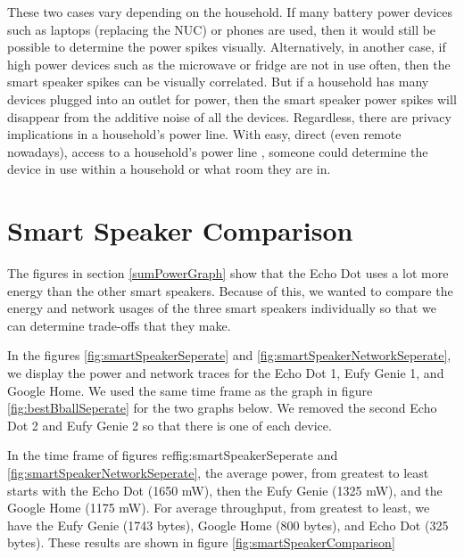 These two cases vary depending on the household. If many battery power devices such as laptops (replacing the NUC) or phones are used, then it would still be possible to determine the power spikes visually. Alternatively, in another case, if high power devices such as the microwave or fridge are not in use often, then the smart speaker spikes can be visually correlated. But if a household has many devices plugged into an outlet for power, then the smart speaker power spikes will disappear from the additive noise of all the devices. Regardless, there are privacy implications in a household's power line. With easy, direct (even remote nowadays), access to a household's power line \cite{griffith_2017}, someone could determine the device in use within a household or what room they are in.

\section{Smart Speaker Comparison}
\label{smartSpeakerComparisonSection}
The figures in section \ref{sumPowerGraph} show that the Echo Dot uses a lot more energy than the other smart speakers. Because of this, we wanted to compare the energy and network usages of the three smart speakers individually so that we can determine trade-offs that they make.

In the figures \ref{fig:smartSpeakerSeperate} and \ref{fig:smartSpeakerNetworkSeperate}, we display the power and network traces for the Echo Dot 1, Eufy Genie 1, and Google Home. We used the same time frame as the graph in figure \ref{fig:bestBballSeperate} for the two graphs below. We removed the second Echo Dot 2 and Eufy Genie 2 so that there is one of each device.

In the time frame of figures ref{fig:smartSpeakerSeperate} and \ref{fig:smartSpeakerNetworkSeperate}, the average power, from greatest to least starts with the Echo Dot (1650 mW), then the Eufy Genie (1325 mW), and the Google Home (1175 mW). For average throughput, from greatest to least, we have the Eufy Genie (1743 bytes), Google Home (800 bytes), and Echo Dot (325 bytes). These results are shown in figure \ref{fig:smartSpeakerComparison}

